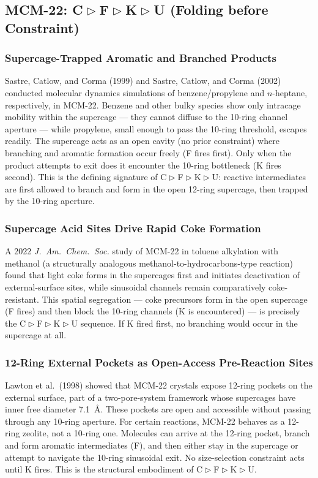 \documentclass[11pt]{article}
\newcommand{\comp}{\mathrel{\triangleright}} %
\begin{document}
\subsection{MCM-22: C$\comp$F$\comp$K$\comp$U (Folding before Constraint)}

\subsubsection{Supercage-Trapped Aromatic and Branched Products}

Sastre, Catlow, and Corma (1999) and Sastre, Catlow, and Corma (2002) conducted molecular dynamics simulations of benzene/propylene and $n$-heptane, respectively, in MCM-22. Benzene and other bulky species show only intracage mobility within the supercage --- they cannot diffuse to the 10-ring channel aperture --- while propylene, small enough to pass the 10-ring threshold, escapes readily. The supercage acts as an open cavity (no prior constraint) where branching and aromatic formation occur freely (F fires first). Only when the product attempts to exit does it encounter the 10-ring bottleneck (K fires second). This is the defining signature of C$\comp$F$\comp$K$\comp$U: reactive intermediates are first allowed to branch and form in the open 12-ring supercage, then trapped by the 10-ring aperture.

\subsubsection{Supercage Acid Sites Drive Rapid Coke Formation}

A 2022 \emph{J.\ Am.\ Chem.\ Soc.} study of MCM-22 in toluene alkylation with methanol (a structurally analogous methanol-to-hydrocarbons-type reaction) found that light coke forms in the supercages first and initiates deactivation of external-surface sites, while sinusoidal channels remain comparatively coke-resistant. This spatial segregation --- coke precursors form in the open supercage (F fires) and then block the 10-ring channels (K is encountered) --- is precisely the C$\comp$F$\comp$K$\comp$U sequence. If K fired first, no branching would occur in the supercage at all.

\subsubsection{12-Ring External Pockets as Open-Access Pre-Reaction Sites}

Lawton et al.\ (1998) showed that MCM-22 crystals expose 12-ring pockets on the external surface, part of a two-pore-system framework whose supercages have inner free diameter 7.1~\AA{}. These pockets are open and accessible without passing through any 10-ring aperture. For certain reactions, MCM-22 behaves as a 12-ring zeolite, not a 10-ring one. Molecules can arrive at the 12-ring pocket, branch and form aromatic intermediates (F), and then either stay in the supercage or attempt to navigate the 10-ring sinusoidal exit. No size-selection constraint acts until K fires. This is the structural embodiment of C$\comp$F$\comp$K$\comp$U.
\end{document}
